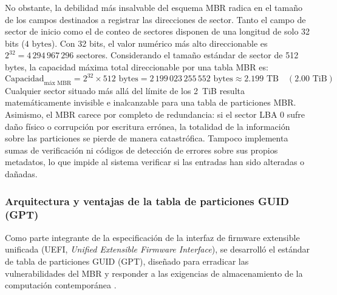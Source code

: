 \documentclass[12pt]{article}
\begin{document}
No obstante, la debilidad más insalvable del esquema MBR radica en el tamaño de los campos destinados a registrar las direcciones de sector. Tanto el campo de sector de inicio como el de conteo de sectores disponen de una longitud de solo 32 bits ($4\text{ bytes}$). Con 32 bits, el valor numérico más alto direccionable es $2^{32} = 4\,294\,967\,296$ sectores. Considerando el tamaño estándar de sector de 512 bytes, la capacidad máxima total direccionable por una tabla MBR es:
\begin{equation}
    \text{Capacidad}_{\text{máx MBR}} = 2^{32} \times 512\text{ bytes} = 2\,199\,023\,255\,552\text{ bytes} \approx 2.199\text{ TB} \quad (2.00\text{ TiB})
\end{equation}
Cualquier sector situado más allá del límite de los 2~TiB resulta matemáticamente invisible e inalcanzable para una tabla de particiones MBR. Asimismo, el MBR carece por completo de redundancia: si el sector LBA 0 sufre daño físico o corrupción por escritura errónea, la totalidad de la información sobre las particiones se pierde de manera catastrófica. Tampoco implementa sumas de verificación ni códigos de detección de errores sobre sus propios metadatos, lo que impide al sistema verificar si las entradas han sido alteradas o dañadas.

\subsubsection{Arquitectura y ventajas de la tabla de particiones GUID (GPT)}

Como parte integrante de la especificación de la interfaz de firmware extensible unificada (UEFI, \textit{Unified Extensible Firmware Interface}), se desarrolló el estándar de tabla de particiones GUID (GPT), diseñado para erradicar las vulnerabilidades del MBR y responder a las exigencias de almacenamiento de la computación contemporánea \parencite{uefi2024specification}.
\end{document}
